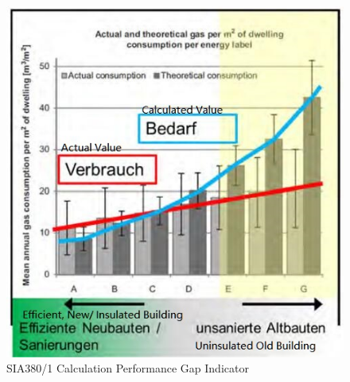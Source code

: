 			\begin{figure}[h!]
			\centering
			\includegraphics[scale=0.65]{Figure/SIA380Issue.jpg}
			\caption{SIA380/1 Calculation Performance Gap Indicator \cite{SIAPreviousreport}}
			\label{fig:SIA380PG}
			\end{figure}

